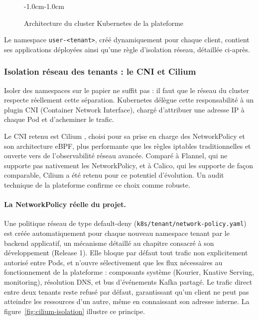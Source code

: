 \begin{figure}[H]
\begin{adjustwidth}{-1.0cm}{-1.0cm}
\caption{Architecture du cluster Kubernetes de la plateforme}
\label{fig:cluster-topology}
\end{adjustwidth}
\end{figure}

Le namespace \texttt{user-<tenant>}, créé dynamiquement pour chaque client, contient ses applications déployées ainsi qu'une règle d'isolation réseau, détaillée ci-après.

\subsubsection{Isolation réseau des tenants : le CNI et Cilium}

Isoler des namespaces sur le papier ne suffit pas : il faut que le réseau du cluster respecte réellement cette séparation. Kubernetes délègue cette responsabilité à un plugin CNI (Container Network Interface), chargé d'attribuer une adresse IP à chaque Pod et d'acheminer le trafic.

Le CNI retenu est Cilium \cite{CiliumDoc}, choisi pour sa prise en charge des NetworkPolicy et son architecture eBPF, plus performante que les règles iptables traditionnelles et ouverte vers de l'observabilité réseau avancée. Comparé à Flannel, qui ne supporte pas nativement les NetworkPolicy, et à Calico, qui les supporte de façon comparable, Cilium a été retenu pour ce potentiel d'évolution. Un audit technique de la plateforme confirme ce choix comme robuste.

\paragraph{La NetworkPolicy réelle du projet.}\mbox{}\par
Une politique réseau de type default-deny (\texttt{k8s/tenant/network-policy.yaml}) est créée automatiquement pour chaque nouveau namespace tenant par le backend applicatif, un mécanisme détaillé au chapitre consacré à son développement (Release 1). Elle bloque par défaut tout trafic non explicitement autorisé entre Pods, et n'ouvre sélectivement que les flux nécessaires au fonctionnement de la plateforme : composants système (Kourier, Knative Serving, monitoring), résolution DNS, et bus d'événements Kafka partagé. Le trafic direct entre deux tenants reste refusé par défaut, garantissant qu'un client ne peut pas atteindre les ressources d'un autre, même en connaissant son adresse interne. La figure~\ref{fig:cilium-isolation} illustre ce principe.

